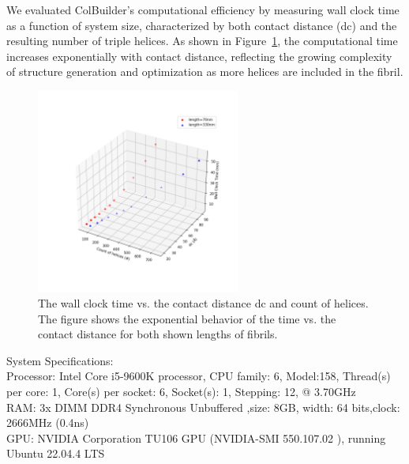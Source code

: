\documentclass[10pt,letterpaper]{article}
\begin{document}
We evaluated ColBuilder's computational efficiency by measuring wall clock time as a function of system size, characterized by both contact distance (dc) and the resulting number of triple helices. As shown in Figure~\ref{fig:SI_comp}, the computational time increases exponentially with contact distance, reflecting the growing complexity of structure generation and optimization as more helices are included in the fibril.
\begin{figure}[!ht]
    \centering
    \includegraphics[width=0.6\textwidth]{figures/comp_performance.png}
    \caption{The wall clock time vs. the contact distance dc and count of helices. The figure shows the exponential behavior of the time vs. the contact distance for both shown lengths of fibrils.}
    \label{fig:SI_comp}
\end{figure}
System Specifications:\\
Processor: Intel Core i5-9600K processor, CPU family: 6, Model:158, Thread(s) per core: 1, Core(s) per socket: 6, Socket(s): 1, Stepping: 12, @ 3.70GHz \\
RAM: 3x DIMM DDR4 Synchronous Unbuffered ,size: 8GB, width: 64 bits,clock: 2666MHz (0.4ns)\\
GPU: NVIDIA Corporation TU106 GPU (NVIDIA-SMI 550.107.02 ), running Ubuntu 22.04.4 LTS\\
\end{document}
